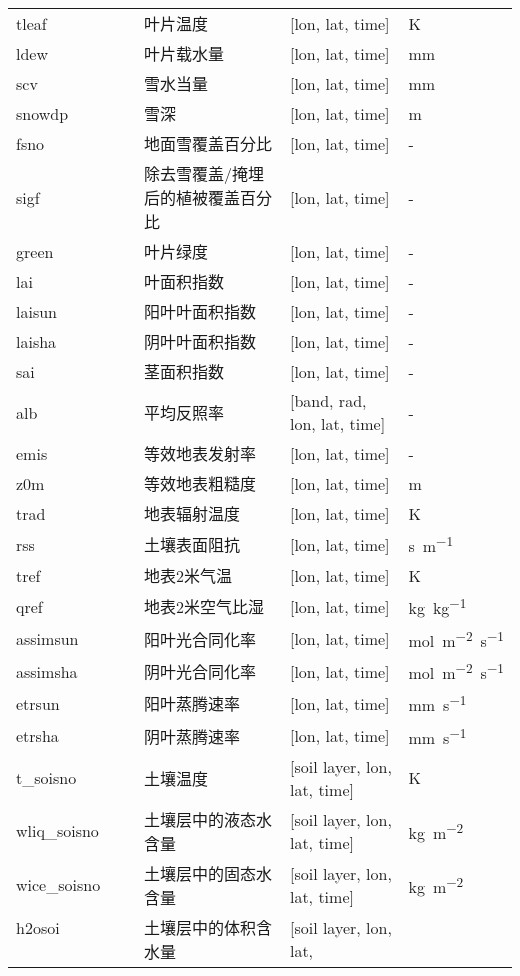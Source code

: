 {\begin{longtable}[htbp]{lp{}p{}l}
tleaf & 叶片温度 & {[}lon, lat, time{]}  & K \\
ldew & 叶片载水量 & {[}lon, lat, time{]}  & mm \\
scv & 雪水当量 & {[}lon, lat, time{]}  & mm \\
snowdp & 雪深 & {[}lon, lat, time{]}  & m \\
fsno & 地面雪覆盖百分比 & {[}lon, lat, time{]}  & - \\
sigf & 除去雪覆盖/掩埋后的植被覆盖百分比 & {[}lon, lat, time{]}  & - \\
green & 叶片绿度 & {[}lon, lat, time{]}  & - \\
lai & 叶面积指数 & {[}lon, lat, time{]}  & - \\
laisun & 阳叶叶面积指数 & {[}lon, lat, time{]}  & - \\
laisha & 阴叶叶面积指数 & {[}lon, lat, time{]}  & - \\
sai & 茎面积指数 & {[}lon, lat, time{]}  & - \\
alb & 平均反照率 & {[}band, rad, lon, lat, time{]}  & - \\ %
emis & 等效地表发射率 & {[}lon, lat, time{]}  & - \\
z0m & 等效地表粗糙度 & {[}lon, lat, time{]}  & m \\
trad & 地表辐射温度 & {[}lon, lat, time{]}  & K \\
rss & 土壤表面阻抗 & {[}lon, lat, time{]} & \unit{s.m^{-1}}\\
tref & 地表2米气温 & {[}lon, lat, time{]}  & K \\
qref & 地表2米空气比湿 & {[}lon, lat, time{]}  & \unit{kg.kg^{-1}} \\
assimsun  & 阳叶光合同化率 & {[}lon, lat, time{]}  & \unit{mol.m^{-2}.s^{-1}} \\
assimsha  & 阴叶光合同化率 & {[}lon, lat, time{]}  & \unit{mol.m^{-2}.s^{-1}} \\
etrsun  & 阳叶蒸腾速率 & {[}lon, lat, time{]}  & \unit{mm.s^{-1}} \\
etrsha & 阴叶蒸腾速率 & {[}lon, lat, time{]}  & \unit{mm.s^{-1}} \\
t\_soisno ~ ~ ~ & 土壤温度 & {[}soil layer, lon, lat, time{]} & K \\
wliq\_soisno~ ~ & 土壤层中的液态水含量 & {[}soil layer, lon, lat, time{]} & \unit{kg.m^{-2}} \\
wice\_soisno~ ~ & 土壤层中的固态水含量& {[}soil layer, lon, lat, time{]} & \unit{kg.m^{-2}} \\
h2osoi ~ ~ ~ ~ ~ ~ ~ & 土壤层中的体积含水量 & {[}soil layer, lon, lat,

\end{longtable}}
